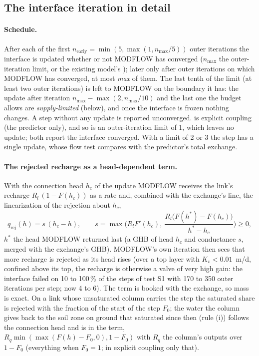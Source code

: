 \subsection{The interface iteration in detail}\label{sec:szinterface}

\paragraph{Schedule.} After each of the first $n_{\mathrm{early}}=\min(5,\max(1,n_{\max}/5))$ outer iterations the interface
is updated whether or not MODFLOW has converged ($n_{\max}$ the outer-iteration limit,  or the
existing model's ); later only after outer iterations on which MODFLOW has converged, at most
 \emph{max} of them. The last tenth of the limit (at least two outer iterations) is left to MODFLOW
on the boundary it has: the update after iteration $n_{\max}-\max(2,n_{\max}/10)$ and the last one the budget allows are
\emph{supply-limited} (below), and once the interface is frozen nothing changes. A step without any update is reported
unconverged.  is explicit coupling (the predictor only), and so is an outer-iteration limit of 1,
which leaves no update; both report the interface converged. With a limit of 2 or 3 the step has a single update, whose
flow test compares with the predictor's total exchange.

\paragraph{The rejected recharge as a head-dependent term.} With the connection head $h_c$ of the update MODFLOW receives
the link's recharge $R_l\,(1-F(h_c))$ as a rate and, combined with the exchange's line, the linearization of the rejection
about $h_c$,
\begin{equation}
q_{\mathrm{rej}}(h)=s\,(h_c-h),\qquad s=\max\Big(R_lF'(h_c),\ \frac{R_l\big(F(h^*)-F(h_c)\big)}{h^*-h_c}\Big)\ge0,
\end{equation}
$h^*$ the head MODFLOW returned last (a GHB of head $h_c$ and conductance $s$, merged with the exchange's GHB). MODFLOW's own
iteration then sees that more recharge is rejected as its head rises (over a top layer with $K_v<0.01$~m/d, confined above
its top, the recharge is otherwise a valve of very high gain: the interface failed on 10 to 100\,\% of the steps of test S1
with 170 to 350 outer iterations per step; now 4 to 6). The term is booked with the exchange, so mass is exact. On a link
whose unsaturated column carries the step the saturated share is rejected with the fraction of the start of the step $F_0$;
the water the column gives back to the soil zone on ground that saturated since then (rule (i)) follows the connection head
and is in the term, $R_q\min(\max(F(h)-F_0,0),1-F_0)$ with $R_q$ the column's outputs over $1-F_0$ (everything when $F_0=1$;
in explicit coupling only that).

